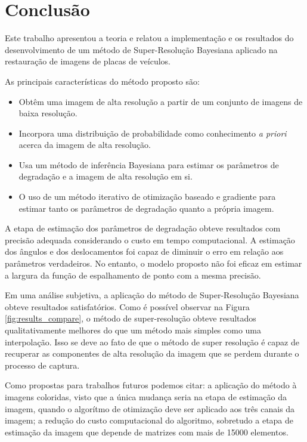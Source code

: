 \chapter{Conclusão}
\label{chap:conclusao}
Este trabalho apresentou a teoria e relatou a implementação e os resultados do desenvolvimento de um método de Super-Resolução Bayesiana aplicado na restauração de imagens de placas de veículos.

As principais características do método proposto são:
\begin{itemize}
	\item Obtêm uma imagem de alta resolução a partir de um conjunto de imagens de baixa resolução.
	\item Incorpora uma distribuição de probabilidade como conhecimento \emph{a priori} acerca da imagem de alta resolução.
	\item Usa um método de inferência Bayesiana para estimar os parâmetros de degradação e a imagem de alta resolução em si.
	\item O uso de um método iterativo de otimização baseado e gradiente para estimar tanto os parâmetros de degradação quanto a própria imagem.

\end{itemize}

A etapa de estimação dos parâmetros de degradação obteve resultados com precisão adequada considerando o custo em tempo computacional.
A estimação dos ângulos e dos deslocamentos foi capaz de diminuir o erro em relação aos parâmetros verdadeiros.
No entanto, o modelo proposto não foi eficaz em estimar a largura da função de espalhamento de ponto com a mesma precisão.

Em uma análise subjetiva, a aplicação do método de Super-Resolução Bayesiana obteve resultados satisfatórios. 
Como é possível observar na Figura \ref{fig:results_compare}, o método de super-resolução obteve resultados qualitativamente melhores do que um método mais simples como uma interpolação. Isso se deve ao fato de que o método de super resolução é capaz de recuperar as componentes de alta resolução da imagem que se perdem durante o processo de captura.

Como propostas para trabalhos futuros podemos citar: a aplicação do método à imagens
coloridas, visto que a única mudança seria na etapa de estimação da imagem,
quando o algorítmo de otimização deve ser aplicado aos três canais da imagem;
a redução do custo computacional do algoritmo, sobretudo a etapa de estimação da imagem
que depende de matrizes com mais de 15000 elementos.


